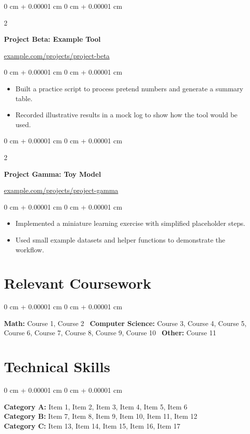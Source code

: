 \documentclass[10pt, letterpaper]{article}
\newenvironment{highlights}{
    \begin{itemize}[
        topsep=0.10 cm,
        parsep=0.10 cm,
        partopsep=0pt,
        itemsep=0pt,
        leftmargin=0 cm + 10pt
    ]
}{
    \end{itemize}
} %
\newenvironment{onecolentry}{
    \begin{adjustwidth}{
        0 cm + 0.00001 cm
    }{
        0 cm + 0.00001 cm
    }
}{
    \end{adjustwidth}
} %
\newenvironment{twocolentry}[2][]{
    \onecolentry
    \def\secondColumn{#2}
    \setcolumnwidth{\fill, 7.5 cm}
    \begin{paracol}{2}
}{
    \switchcolumn \raggedleft \secondColumn
    \end{paracol}
    \endonecolentry
} %
\begin{document}
\vspace{0.2 cm}
\begin{twocolentry}{\href{https://example.com/projects/project-beta}{example.com/projects/project-beta}}
\textbf{Project Beta: Example Tool}
\end{twocolentry}
\vspace{0.1 cm}
\begin{onecolentry}
\begin{highlights}
    \item Built a practice script to process pretend numbers and generate a summary table.
    \item Recorded illustrative results in a mock log to show how the tool would be used.
\end{highlights}
\end{onecolentry}

\vspace{0.2 cm}
\begin{twocolentry}{\href{https://example.com/projects/project-gamma}{example.com/projects/project-gamma}}
\textbf{Project Gamma: Toy Model}
\end{twocolentry}
\vspace{0.1 cm}
\begin{onecolentry}
\begin{highlights}
    \item Implemented a miniature learning exercise with simplified placeholder steps.
    \item Used small example datasets and helper functions to demonstrate the workflow.
\end{highlights}
\end{onecolentry}

\section{Relevant Coursework}
\begin{onecolentry}
\textbf{Math:} Course 1, Course 2 \
\textbf{Computer Science:} Course 3, Course 4, Course 5, Course 6, Course 7, Course 8, Course 9, Course 10 \
\textbf{Other:} Course 11
\end{onecolentry}

\section{Technical Skills}
\begin{onecolentry}
\textbf{Category A:} Item 1, Item 2, Item 3, Item 4, Item 5, Item 6 \\
\textbf{Category B:} Item 7, Item 8, Item 9, Item 10, Item 11, Item 12 \\
\textbf{Category C:} Item 13, Item 14, Item 15, Item 16, Item 17
\end{onecolentry}
\end{document}
